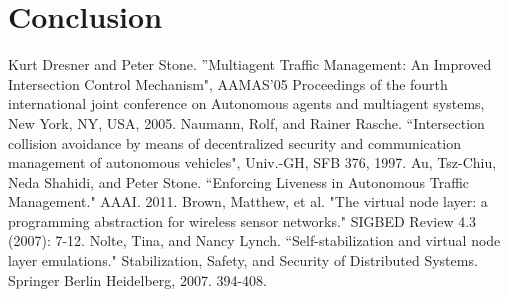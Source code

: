 \documentclass[12pt]{article}
\begin{document}
\section{Conclusion}
\label{sec:conclusion}

\pagebreak

\begin{thebibliography}{9}

Kurt Dresner and Peter Stone. ''Multiagent Traffic Management: An Improved Intersection
Control Mechanism", AAMAS'05 Proceedings of the fourth international joint conference on Autonomous agents and multiagent systems, New York, NY, USA, 2005.
Naumann, Rolf, and Rainer Rasche. ``Intersection collision avoidance by means of decentralized security and communication management of autonomous vehicles", Univ.-GH, SFB 376, 1997.
Au, Tsz-Chiu, Neda Shahidi, and Peter Stone. ``Enforcing Liveness in Autonomous Traffic Management." AAAI. 2011.
Brown, Matthew, et al. "The virtual node layer: a programming abstraction for wireless sensor networks." SIGBED Review 4.3 (2007): 7-12.
Nolte, Tina, and Nancy Lynch. ``Self-stabilization and virtual node layer emulations." Stabilization, Safety, and Security of Distributed Systems. Springer Berlin Heidelberg, 2007. 394-408.
\end{thebibliography}
\end{document}
